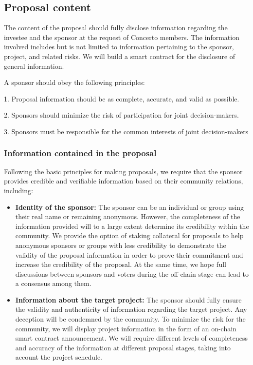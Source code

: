 \documentclass[UTF8]{article}
\begin{document}
\begin{multicols}{2}
\subsection{Proposal content}

The content of the proposal should fully disclose information regarding the investee and the sponsor at the request of Concerto members. The information involved includes but is not limited to information pertaining to the sponsor, project, and related risks. We will build a smart contract for the disclosure of general information.

A sponsor should obey the following principles:

1. Proposal information should be as complete, accurate, and valid as possible.

2. Sponsors should minimize the risk of participation for joint decision-makers.

3. Sponsors must be responsible for the common interests of joint decision-makers


\subsubsection{Information contained in the proposal}
Following the basic principles for making proposals, we require that the sponsor provides credible and verifiable information based on their community relations, including:


\begin{itemize}
\item \textbf{Identity of the sponsor: }
The sponsor can be an individual or group using their real name or remaining anonymous. However, the completeness of the information provided will to a large extent determine its credibility within the community. We provide the option of staking collateral for proposals to help anonymous sponsors or groups with less credibility to demonstrate the validity of the proposal information in order to prove their commitment and increase the credibility of the proposal. At the same time, we hope full discussions between sponsors and voters during the off-chain stage can lead to a consensus among them.

\item \textbf{Information about the target project: }
The sponsor should fully ensure the validity and authenticity of information regarding the target project. Any deception will be condemned by the community. To minimize the risk for the community, we will display project information in the form of an on-chain smart contract announcement. We will require different levels of completeness and accuracy of the information at different proposal stages, taking into account the project schedule.
\end{itemize}


\end{multicols}
\end{document}
